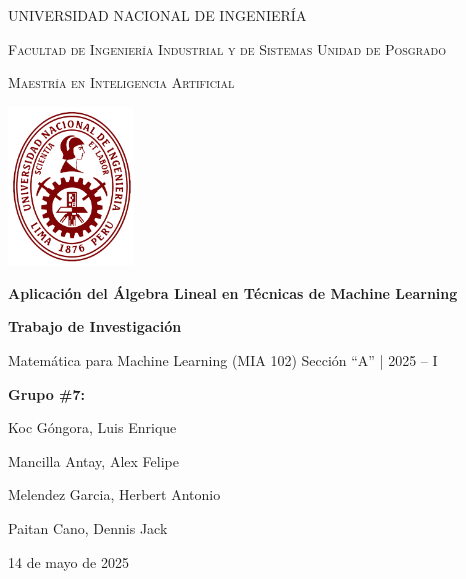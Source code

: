 \documentclass[12pt]{article}
\begin{document}
        
        \begin{titlepage}
                \centering
                {\scshape\Large UNIVERSIDAD NACIONAL DE INGENIERÍA \par}
                {\scshape\large Facultad de Ingeniería Industrial y de Sistemas Unidad de Posgrado \par}
                {\scshape\large Maestría en Inteligencia Artificial \par}
                \vspace{2cm}
                
                \includegraphics[width=0.25\textwidth]{imagenes/logo.png}\par\vspace{1cm}
                
                {\Huge\bfseries Aplicación del Álgebra Lineal en Técnicas de Machine Learning \par}
                \vspace{1.5cm}
                {\large\bfseries Trabajo de Investigación \par}
                \vspace{0.5cm}
                {\large Matemática para Machine Learning (MIA 102) Sección “A” | 2025 – I \par}
                \vspace{0.5cm}
                {\large\bfseries Grupo \#7: \par}
                \vspace{0.5cm}
                {\large Koc Góngora, Luis Enrique \par}
                {\large Mancilla Antay, Alex Felipe \par}
                {\large Melendez Garcia, Herbert Antonio \par}
                {\large Paitan Cano, Dennis Jack \par}
                \vfill
                {\large 14 de mayo de 2025 \par}
        \end{titlepage}
        
\end{document}
